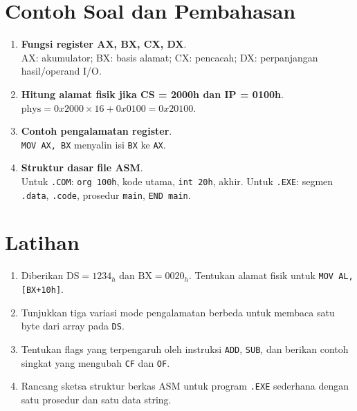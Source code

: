\section{Contoh Soal dan Pembahasan}
\begin{enumerate}
  \item \textbf{Fungsi register AX, BX, CX, DX}.\\ AX: akumulator; BX: basis alamat; CX: pencacah; DX: perpanjangan hasil/operand I/O.
  \item \textbf{Hitung alamat fisik jika CS = 2000h dan IP = 0100h}.\\ \(\text{phys} = 0x2000\times 16 + 0x0100 = 0x20100\).
  \item \textbf{Contoh pengalamatan register}.\\ \texttt{MOV AX, BX} menyalin isi \texttt{BX} ke \texttt{AX}.
  \item \textbf{Struktur dasar file ASM}.\\ Untuk \texttt{.COM}: \texttt{org 100h}, kode utama, \texttt{int 20h}, akhir. Untuk \texttt{.EXE}: segmen \texttt{.data}, \texttt{.code}, prosedur \texttt{main}, \texttt{END main}.
\end{enumerate}

\section{Latihan}
\begin{enumerate}
  \item Diberikan \(\text{DS}=1234_h\) dan \(\text{BX}=0020_h\). Tentukan alamat fisik untuk \texttt{MOV AL, [BX+10h]}.
  \item Tunjukkan tiga variasi mode pengalamatan berbeda untuk membaca satu byte dari array pada \texttt{DS}.
  \item Tentukan flags yang terpengaruh oleh instruksi \texttt{ADD}, \texttt{SUB}, dan berikan contoh singkat yang mengubah \texttt{CF} dan \texttt{OF}.
  \item Rancang sketsa struktur berkas ASM untuk program \texttt{.EXE} sederhana dengan satu prosedur dan satu data string.
\end{enumerate}
